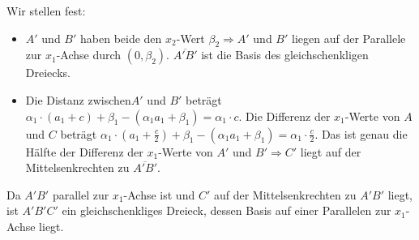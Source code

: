 \documentclass{scrartcl}
\begin{document}
Wir stellen fest: \\

\begin{itemize}
\item{$A'$ und $B'$ haben beide den $x_2$-Wert $\beta_2 \Rightarrow A'$ und $B'$ liegen auf der Parallele
zur $x_1$-Achse durch $(0, \beta_2)$. $\overline{A'B'}$ ist die Basis des gleichschenkligen Dreiecks.}
\item{Die Distanz zwischen$A'$ und $B'$ beträgt $\alpha_1 \cdot (a_1 + c) + \beta_1 - (\alpha_1 a_1 +
\beta_1) = \alpha_1 \cdot c$. Die Differenz der $x_1$-Werte von $A$ und $C$ beträgt $\alpha_1 \cdot (a_1 +
\frac{c}{2}) + \beta_1 - (\alpha_1 a_1 + \beta_1) = \alpha_1 \cdot \frac{c}{2}$. Das ist genau
die Hälfte der Differenz der $x_1$-Werte von $A'$ und $B' \Rightarrow C'$ liegt auf der Mittelsenkrechten
zu $\overline{A'B'}$.}
\end{itemize}

Da $A'B'$ parallel zur $x_1$-Achse ist und $C'$ auf der Mittelsenkrechten zu $A'B'$ liegt, ist $A'B'C'$
ein gleichschenkliges Dreieck, dessen Basis auf einer Parallelen zur $x_1$-Achse liegt.
\end{document}
